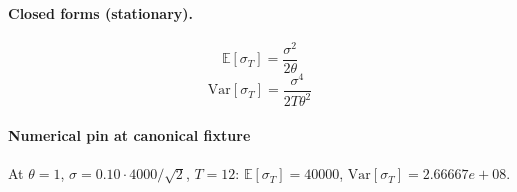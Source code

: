 \paragraph{Closed forms (stationary).}
\[ \mathbb{E}[\sigma_T] = \frac{\sigma^{2}}{2 \theta} \]
\[ \mathrm{Var}[\sigma_T] = \frac{\sigma^{4}}{2 T \theta^{2}} \]
\paragraph{Numerical pin at canonical fixture}
At $\theta = 1$, $\sigma = 0.10 \cdot 4000 / \sqrt{2}$, $T = 12$: $\mathbb{E}[\sigma_T] = 40000$, $\mathrm{Var}[\sigma_T] = 2.66667e+08$.
